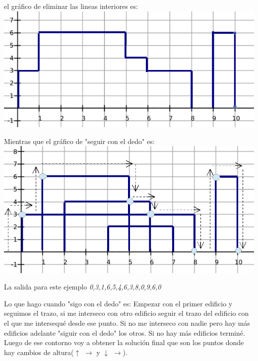 \documentclass{article}
\begin{document}
el gr\'afico de eliminar las lineas interiores es:\newline
\includegraphics[width=\textwidth,height=\textheight,keepaspectratio
]{edificiosGraf2b.png}
\begin {flushleft}
\end{flushleft}
\newpage
Mientras que el gr\'afico de "seguir con el dedo" es: \newline
\includegraphics[width=\textwidth,height=\textheight,keepaspectratio
]{edificiosGraf2c.png}
\begin {flushleft}
La salida para este ejemplo  \textit{{0,3,1,6,5,4,6,3,8,0,9,6,0}}
\end{flushleft}

Lo que hago cuando "sigo con el dedo" es: \newline
Empezar con el primer edificio y seguimos el trazo, si me interseco con otro edificio seguir el trazo del edificio con el que me intersequ\'e desde ese punto. \newline
Si no me interseco con nadie pero hay m\'as edificios adelante "siguir con el dedo" los otros. Si no hay más edificios termin\'e.\newline
Luego de ese contorno voy a obtener la soluci\'on final que son los puntos donde hay cambios de altura($\uparrow$ $\longrightarrow$ y $\downarrow$ $\longrightarrow$). \newline
\end{document}
